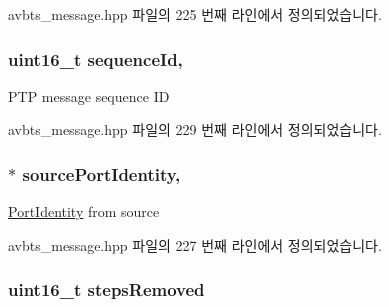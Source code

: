 avbts\+\_\+message.\+hpp 파일의 225 번째 라인에서 정의되었습니다.

\subsubsection[{\texorpdfstring{sequence\+Id}{sequenceId}}]{\setlength{\rightskip}{0pt plus 5cm}uint16\+\_\+t sequence\+Id\hspace{0.3cm}{\ttfamily [protected]}, {\ttfamily [inherited]}}\hypertarget{class_p_t_p_message_common_a189710d5cff10c03f77d72a276a5f58e}{}\label{class_p_t_p_message_common_a189710d5cff10c03f77d72a276a5f58e}
P\+TP message sequence ID 

avbts\+\_\+message.\+hpp 파일의 229 번째 라인에서 정의되었습니다.

\subsubsection[{\texorpdfstring{source\+Port\+Identity}{sourcePortIdentity}}]{$\ast$ source\+Port\+Identity\hspace{0.3cm}{\ttfamily [protected]}, {\ttfamily [inherited]}}\hypertarget{class_p_t_p_message_common_a415b5544bdd3ea41dae460fa1af900d9}{}\label{class_p_t_p_message_common_a415b5544bdd3ea41dae460fa1af900d9}
\hyperlink{class_port_identity}{Port\+Identity} from source 

avbts\+\_\+message.\+hpp 파일의 227 번째 라인에서 정의되었습니다.

\subsubsection[{\texorpdfstring{steps\+Removed}{stepsRemoved}}]{\setlength{\rightskip}{0pt plus 5cm}uint16\+\_\+t steps\+Removed\hspace{0.3cm}{\ttfamily [private]}}\hypertarget{class_p_t_p_message_announce_ab24df4cccbede4b07586878ef0d47395}{}\label{class_p_t_p_message_announce_ab24df4cccbede4b07586878ef0d47395}


